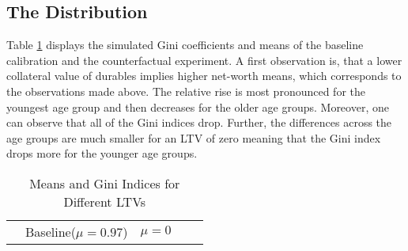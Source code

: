 \documentclass[a4paper,12pt,legno]{article}
\begin{document}
\subsection{The Distribution}
Table \ref{ginis_means_LTV} displays the simulated Gini coefficients and means of the baseline calibration and the counterfactual experiment. A first observation is, that a lower collateral value of durables implies higher net-worth means, which corresponds to the observations made above. The relative rise is most pronounced for the youngest age group and then decreases for the older age groups. 
Moreover, one can observe that all of the Gini indices drop. Further, the differences across the age groups are much smaller for an LTV of zero meaning that the Gini index drops more for the younger age groups.


\begin{table}[!htbp]
\centering
\caption{Means and Gini Indices for Different LTVs}
\label{ginis_means_LTV}
\begin{tabular}{@{}lllll@{}}
\toprule
                                                                                 & Baseline($\mu = 0.97$) & $\mu = 0$
                                                                 

\end{tabular}
\end{table}
\end{document}
